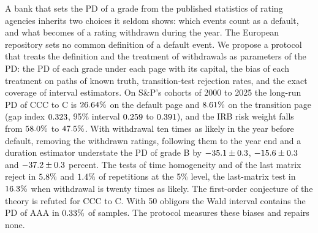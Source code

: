 A bank that sets the PD of a grade from the published statistics of rating agencies inherits two choices it seldom shows: which events count as a default, and what becomes of a rating withdrawn during the year. The European repository sets no common definition of a default event. We propose a protocol that treats the definition and the treatment of withdrawals as parameters of the PD: the PD of each grade under each page with its capital, the bias of each treatment on paths of known truth, transition-test rejection rates, and the exact coverage of interval estimators. On S\&P's cohorts of 2000 to 2025 the long-run PD of CCC to C is $26.64\%$ on the default page and $8.61\%$ on the transition page (gap index $0.323$, 95\% interval $0.259$ to $0.391$), and the IRB risk weight falls from $58.0\%$ to $47.5\%$. With withdrawal ten times as likely in the year before default, removing the withdrawn ratings, following them to the year end and a duration estimator understate the PD of grade B by $-35.1\pm0.3$, $-15.6\pm0.3$ and $-37.2\pm0.3$ percent. The tests of time homogeneity and of the last matrix reject in $5.8\%$ and $1.4\%$ of repetitions at the 5\% level, the last-matrix test in $16.3\%$ when withdrawal is twenty times as likely. The first-order conjecture of the theory is refuted for CCC to C. With 50 obligors the Wald interval contains the PD of AAA in $0.33\%$ of samples. The protocol measures these biases and repairs none. %
